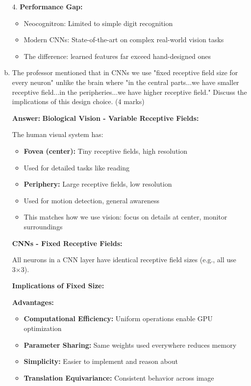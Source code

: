\documentclass[12pt]{article}
\newcommand{\answer}[1]{{\color{answercolor}\textbf{Answer:} #1}}
\newcommand{\explanation}[1]{{\color{explanationcolor}#1}}
\begin{document}
\begin{enumerate}[(a)]
{{    4. \textbf{Performance Gap:}
    \begin{itemize}
        \item Neocognitron: Limited to simple digit recognition
        \item Modern CNNs: State-of-the-art on complex real-world vision tasks
        \item The difference: learned features far exceed hand-designed ones
    \end{itemize}
    }
    }
    
    \item The professor mentioned that in CNNs we use "fixed receptive field size for every neuron" unlike the brain where "in the central parts...we have smaller receptive field...in the peripheries...we have higher receptive field." Discuss the implications of this design choice. \hfill (4 marks)
    
    \answer{
    \textbf{Biological Vision - Variable Receptive Fields:}
    
    \explanation{
    The human visual system has:
    \begin{itemize}
        \item \textbf{Fovea (center):} Tiny receptive fields, high resolution
        \item Used for detailed tasks like reading
        \item \textbf{Periphery:} Large receptive fields, low resolution  
        \item Used for motion detection, general awareness
        \item This matches how we use vision: focus on details at center, monitor surroundings
    \end{itemize}
    }
    
    \textbf{CNNs - Fixed Receptive Fields:}
    
    \explanation{
    All neurons in a CNN layer have identical receptive field sizes (e.g., all use 3×3).
    }
    
    \textbf{Implications of Fixed Size:}
    
    \explanation{
    \textbf{Advantages:}
    \begin{itemize}
        \item \textbf{Computational Efficiency:} Uniform operations enable GPU optimization
        \item \textbf{Parameter Sharing:} Same weights used everywhere reduces memory
        \item \textbf{Simplicity:} Easier to implement and reason about
        \item \textbf{Translation Equivariance:} Consistent behavior across image
    \end{itemize}
    
}}
\end{enumerate}
\end{document}

